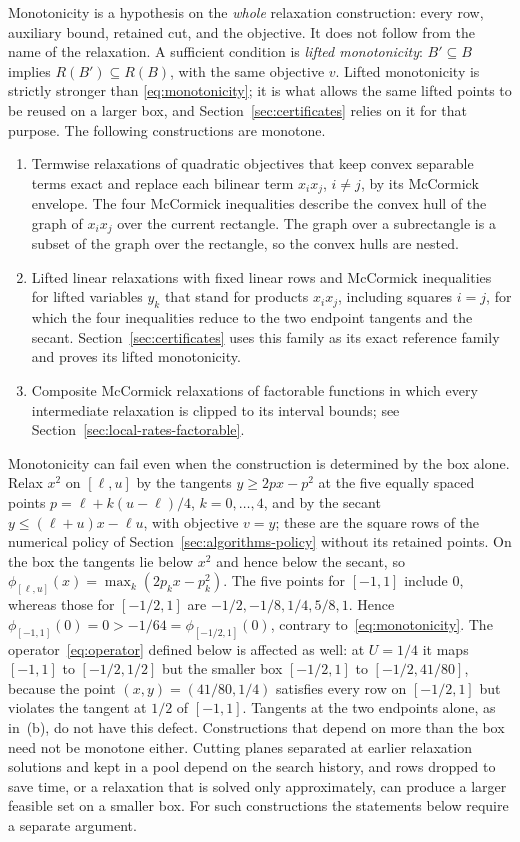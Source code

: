 Monotonicity is a hypothesis on the \emph{whole} relaxation construction:
every row, auxiliary bound, retained cut, and the objective. It does not
follow from the name of the relaxation. A sufficient condition is
\emph{lifted monotonicity}: $B'\subseteq B$ implies $R(B')\subseteq R(B)$,
with the same objective $v$. Lifted monotonicity is strictly stronger than
\eqref{eq:monotonicity}; it is what allows the same lifted points to be
reused on a larger box, and Section~\ref{sec:certificates} relies on it for
that purpose. The following constructions are monotone.
\begin{enumerate}[label=(\alph*)]
\item Termwise relaxations of quadratic objectives that keep convex
  separable terms exact and replace each bilinear term $x_ix_j$, $i\ne j$,
  by its McCormick envelope. The four McCormick inequalities describe the
  convex hull of the graph of $x_ix_j$ over the current rectangle. The graph
  over a subrectangle is a subset of the graph over the rectangle, so the
  convex hulls are nested.
\item Lifted linear relaxations with fixed linear rows and McCormick
  inequalities for lifted variables $y_k$ that stand for products $x_ix_j$,
  including squares $i=j$, for which
  the four inequalities reduce to the two endpoint tangents and the secant.
  Section~\ref{sec:certificates} uses this family as its exact reference
  family and proves its lifted monotonicity.
\item Composite McCormick relaxations of factorable functions in which
  every intermediate relaxation is clipped to its interval bounds; see
  Section~\ref{sec:local-rates-factorable}.
\end{enumerate}
Monotonicity can fail even when the construction is determined by the box
alone. Relax $x^2$ on $[\ell,u]$ by the tangents $y\ge2px-p^2$ at the five
equally spaced points $p=\ell+k(u-\ell)/4$, $k=0,\dots,4$, and by the secant
$y\le(\ell+u)x-\ell u$, with objective $v=y$; these are the square rows of the
numerical policy of Section~\ref{sec:algorithms-policy} without its retained
points. On the box the tangents lie below $x^2$ and hence below the secant,
so $\phi_{[\ell,u]}(x)=\max_k(2p_kx-p_k^2)$. The five points for $[-1,1]$
include $0$, whereas those for $[-1/2,1]$ are $-1/2,-1/8,1/4,5/8,1$. Hence
$\phi_{[-1,1]}(0)=0>-1/64=\phi_{[-1/2,1]}(0)$,
contrary to~\eqref{eq:monotonicity}. The operator~\eqref{eq:operator}
defined below is affected as well: at $U=1/4$ it maps $[-1,1]$ to
$[-1/2,1/2]$ but the smaller box $[-1/2,1]$ to $[-1/2,41/80]$, because the
point $(x,y)=(41/80,1/4)$ satisfies every row on $[-1/2,1]$ but violates the
tangent at $1/2$ of $[-1,1]$. Tangents at the two endpoints alone, as
in~(b), do not have this defect. Constructions that depend on more than the
box need not be monotone either. Cutting planes separated at earlier
relaxation solutions and kept in a pool depend on the search history, and
rows dropped to save time, or a relaxation that is solved only
approximately, can produce a larger feasible set on a smaller box. For such
constructions the statements below require a separate argument.

